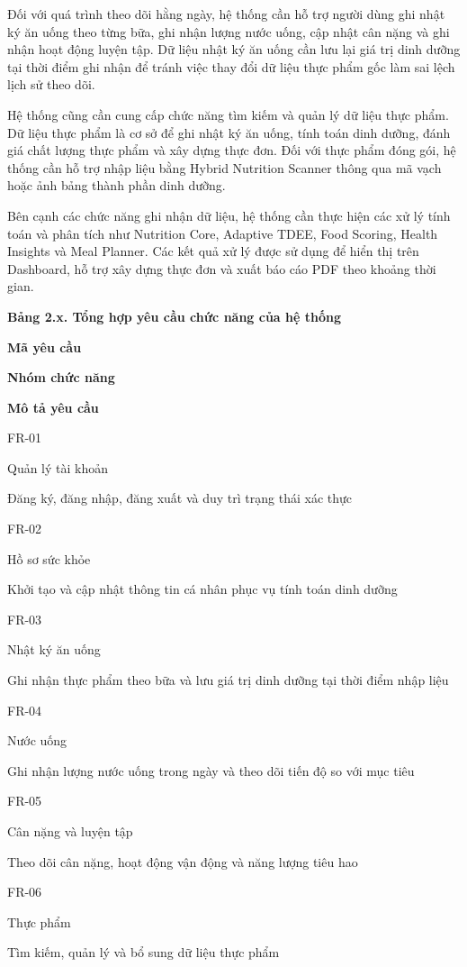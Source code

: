 \documentclass[12pt, a4paper]{report}
\begin{document}
Đối với quá trình theo dõi hằng ngày, hệ thống cần hỗ trợ người dùng ghi nhật ký ăn uống theo từng bữa, ghi nhận lượng nước uống, cập nhật cân nặng và ghi nhận hoạt động luyện tập. Dữ liệu nhật ký ăn uống cần lưu lại giá trị dinh dưỡng tại thời điểm ghi nhận để tránh việc thay đổi dữ liệu thực phẩm gốc làm sai lệch lịch sử theo dõi.

Hệ thống cũng cần cung cấp chức năng tìm kiếm và quản lý dữ liệu thực phẩm. Dữ liệu thực phẩm là cơ sở để ghi nhật ký ăn uống, tính toán dinh dưỡng, đánh giá chất lượng thực phẩm và xây dựng thực đơn. Đối với thực phẩm đóng gói, hệ thống cần hỗ trợ nhập liệu bằng Hybrid Nutrition Scanner thông qua mã vạch hoặc ảnh bảng thành phần dinh dưỡng.

Bên cạnh các chức năng ghi nhận dữ liệu, hệ thống cần thực hiện các xử lý tính toán và phân tích như Nutrition Core, Adaptive TDEE, Food Scoring, Health Insights và Meal Planner. Các kết quả xử lý được sử dụng để hiển thị trên Dashboard, hỗ trợ xây dựng thực đơn và xuất báo cáo PDF theo khoảng thời gian.

\textbf{Bảng 2.x. Tổng hợp yêu cầu chức năng của hệ thống}

\textbf{Mã yêu cầu}

\textbf{Nhóm chức năng}

\textbf{Mô tả yêu cầu}

FR-01

Quản lý tài khoản

Đăng ký, đăng nhập, đăng xuất và duy trì trạng thái xác thực

FR-02

Hồ sơ sức khỏe

Khởi tạo và cập nhật thông tin cá nhân phục vụ tính toán dinh dưỡng

FR-03

Nhật ký ăn uống

Ghi nhận thực phẩm theo bữa và lưu giá trị dinh dưỡng tại thời điểm nhập liệu

FR-04

Nước uống

Ghi nhận lượng nước uống trong ngày và theo dõi tiến độ so với mục tiêu

FR-05

Cân nặng và luyện tập

Theo dõi cân nặng, hoạt động vận động và năng lượng tiêu hao

FR-06

Thực phẩm

Tìm kiếm, quản lý và bổ sung dữ liệu thực phẩm
\end{document}
